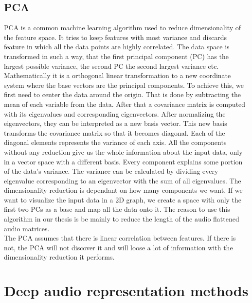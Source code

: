 \subsection{PCA}
PCA is a common machine learning algorithm used to reduce dimensionality of the feature space. It tries to keep features with most variance and discards feature in which all the data points are highly correlated. The data space is transformed in such a way, that the first principal component (PC) has the largest possible variance, the second PC the second largest variance etc. \\
Mathematically it is a orthogonal linear transformation to a new coordinate system where the base vectors are the principal components. To achieve this, we first need to center the data around the origin. That is done by subtracting the mean of each variable from the data. After that a covariance matrix is computed with its eigenvalues and corresponding eigenvectors. After normalizing the eigenvectors, they can be interpreted as a new basis vector. This new basis transforms the covariance matrix so that it becomes diagonal. Each of the diagonal elements represents the variance of each axis. All the components without any reduction give us the whole information about the input data, only in a vector space with a different basis. Every component explains some portion of the data's variance. The variance can be calculated by dividing every eigenvalue corresponding to an eigenvector with the sum of all eigenvalues. The dimensionality reduction is dependant on how many components we want. If we want to visualize the input data in a 2D graph, we create a space with only the first two PCs as a base and map all the data onto it. The reason to use this algorithm in our thesis is be mainly to reduce the length of the audio flattened audio matrices. \\
The PCA assumes that there is linear correlation between features. If there is not, the PCA will not discover it and will loose a lot of information with the dimensionality reduction it performs.

\section{Deep audio representation methods}\label{sec:audio_deep_learning}

